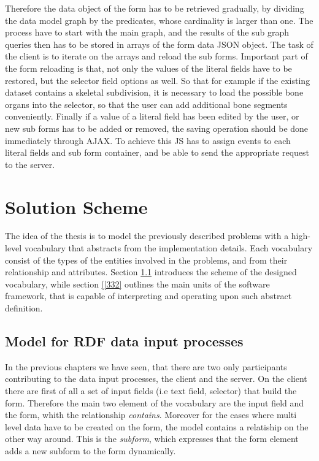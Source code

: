 Therefore the data object of the form has to be retrieved gradually, by dividing the data model graph by the predicates, whose cardinality is larger than one. The process have to start with the main graph, and the results of the sub graph queries then has to be stored in arrays of the form data JSON object. The task of the client is to iterate on the arrays and reload the sub forms. Important part of the form reloading is that, not only the values of the literal fields have to be restored, but the selector field options as well. So that for example if the existing dataset contains a skeletal subdivision, it is necessary to load the possible bone organs into the selector, so that the user can add additional bone segments conveniently.
Finally if a value of a literal field has been edited by the user, or new sub forms has to be added or removed, the saving operation should be done immediately through AJAX. 
To achieve this JS has to assign events to each literal fields and sub form container, and be able to send the appropriate request to the server.


\section{Solution Scheme} \label{33}


The idea of the thesis is to model the previously described problems with a high-level vocabulary that abstracts from the implementation details. Each vocabulary consist of the types of the entities involved in the problems, and from their relationship and attributes. Section \ref{[331]} introduces the scheme of the designed vocabulary, while section \ref{[332} outlines the main units of the software framework, that is capable of interpreting and operating upon such abstract definition.


\subsection{Model for RDF data input processes} \label{[331]}




In the previous chapters we have seen, that there are two only participants contributing to the data input processes, the client and the server. On the client there are first of all a set of input fields (i.e text field, selector) that build the form. Therefore the main two element of the vocabulary are the input field and the form, whith the relationship \textit{contains}. Moreover for the cases where multi level data have to be created on the form, the model contains a relatiship on the other way around. This is the \textit{subform}, which expresses that the form element adds a new subform to the form dynamically.

